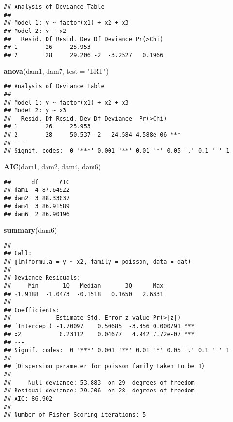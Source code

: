 \documentclass[]{article}
\newenvironment{Shaded}{\begin{snugshade}}{\end{snugshade}}
\newcommand{\KeywordTok}[1]{\textcolor[rgb]{0.13,0.29,0.53}{\textbf{#1}}}
\newcommand{\DataTypeTok}[1]{\textcolor[rgb]{0.13,0.29,0.53}{#1}}
\newcommand{\StringTok}[1]{\textcolor[rgb]{0.31,0.60,0.02}{#1}}
\newcommand{\NormalTok}[1]{#1}
\begin{document}
\begin{verbatim}
## Analysis of Deviance Table
## 
## Model 1: y ~ factor(x1) + x2 + x3
## Model 2: y ~ x2
##   Resid. Df Resid. Dev Df Deviance Pr(>Chi)
## 1        26     25.953                     
## 2        28     29.206 -2  -3.2527   0.1966
\end{verbatim}

\begin{Shaded}
\begin{Highlighting}[]
\KeywordTok{anova}\NormalTok{(dam1, dam7, }\DataTypeTok{test =} \StringTok{"LRT"}\NormalTok{)}
\end{Highlighting}
\end{Shaded}

\begin{verbatim}
## Analysis of Deviance Table
## 
## Model 1: y ~ factor(x1) + x2 + x3
## Model 2: y ~ x3
##   Resid. Df Resid. Dev Df Deviance  Pr(>Chi)    
## 1        26     25.953                          
## 2        28     50.537 -2  -24.584 4.588e-06 ***
## ---
## Signif. codes:  0 '***' 0.001 '**' 0.01 '*' 0.05 '.' 0.1 ' ' 1
\end{verbatim}

\begin{Shaded}
\begin{Highlighting}[]
\KeywordTok{AIC}\NormalTok{(dam1, dam2, dam4, dam6)}
\end{Highlighting}
\end{Shaded}

\begin{verbatim}
##      df      AIC
## dam1  4 87.64922
## dam2  3 88.33037
## dam4  3 86.91589
## dam6  2 86.90196
\end{verbatim}

\begin{Shaded}
\begin{Highlighting}[]
\KeywordTok{summary}\NormalTok{(dam6)}
\end{Highlighting}
\end{Shaded}

\begin{verbatim}
## 
## Call:
## glm(formula = y ~ x2, family = poisson, data = dat)
## 
## Deviance Residuals: 
##     Min       1Q   Median       3Q      Max  
## -1.9188  -1.0473  -0.1518   0.1650   2.6331  
## 
## Coefficients:
##             Estimate Std. Error z value Pr(>|z|)    
## (Intercept) -1.70097    0.50685  -3.356 0.000791 ***
## x2           0.23112    0.04677   4.942 7.72e-07 ***
## ---
## Signif. codes:  0 '***' 0.001 '**' 0.01 '*' 0.05 '.' 0.1 ' ' 1
## 
## (Dispersion parameter for poisson family taken to be 1)
## 
##     Null deviance: 53.883  on 29  degrees of freedom
## Residual deviance: 29.206  on 28  degrees of freedom
## AIC: 86.902
## 
## Number of Fisher Scoring iterations: 5
\end{verbatim}
\end{document}
